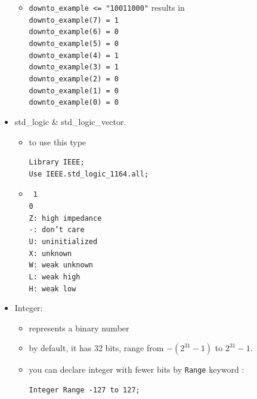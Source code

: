 \documentclass[a4paper]{article}
\begin{document}
\begin{itemize}
\begin{itemize}
\item \texttt{downto\_example <= "10011000"} results in \\ \texttt{downto\_example(7) = 1}\\
\texttt{downto\_example(6) = 0}\\
\texttt{downto\_example(5) = 0}\\
\texttt{downto\_example(4) = 1}\\
\texttt{downto\_example(3) = 1}\\
\texttt{downto\_example(2) = 0}\\
\texttt{downto\_example(1) = 0}\\
\texttt{downto\_example(0) = 0}\\





\end{itemize}
\item std\_logic \& std\_logic\_vector.
\begin{itemize}
\item to use this type
\begin{verbatim}
Library IEEE;
Use IEEE.std_logic_1164.all;
\end{verbatim}

\item \texttt{
1 \\
0 \\
Z: high impedance \\
-: don't care\\
U: uninitialized\\
X: unknown\\
W: weak unknown\\
L: weak high\\
H: weak low}

\end{itemize}

\item Integer:
\begin{itemize}
\item represents a binary number

\item by default, it has 32 bits, range from $-(2^{31}-1)$ to $2^{31}-1$.
\item you can declare integer with fewer bits by  \texttt{Range} keyword :
\begin{verbatim}
Integer Range -127 to 127;
\end{verbatim}
\end{itemize}


\end{itemize}
\end{document}
